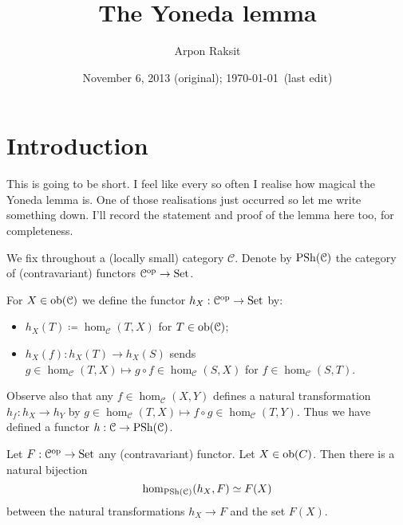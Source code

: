 


\title{The Yoneda lemma}
\author{Arpon Raksit}
\date{November 6, 2013 (original); \today\ (last edit)}


\maketitle
\thispagestyle{fancy}


\renewcommand{\C}{\mathcal{C}}

\section{Introduction}

This is going to be short. I feel like every so often I realise how
magical the Yoneda lemma is. One of those realisations just occurred
so let me write something down. I'll record the statement and proof of
the lemma here too, for completeness.

\begin{notation}
  We fix throughout a (locally small) category $\C$. Denote by
  $\PSh(\C)$ the category of (contravariant) functors $\C^\op \to
  \Set$.
\end{notation}

\begin{definition}
  For $X \in \ob(\C)$ we define the functor $h_X : \C^\op \to \Set$
  by:
  \begin{itemize}
  \item $h_X(T) \coloneqq \hom_\C(T,X)$ for $T \in \ob(\C)$;
  \item $h_X(f) : h_X(T) \to h_X(S)$ sends $g \in \hom_\C(T,X) \mapsto
    g \circ f \in \hom_\C(S,X)$ for $f \in \hom_\C(S,T)$.
  \end{itemize}
  Observe also that any $f \in \hom_\C(X,Y)$ defines a natural
  transformation $h_f : h_X \to h_Y$ by $g \in \hom_\C(T,X) \mapsto f
  \circ g \in \hom_\C(T,Y)$. Thus we have defined a functor $h : \C
  \to \PSh(\C)$.
\end{definition}

\begin{lemma}[Yoneda]
  Let $F : \C^\op \to \Set$ any (contravariant) functor. Let $X \in
  \operatorname{ob}(C)$. Then there is a natural bijection
  \[
  \hom_{\PSh(\C)}(h_X,F) \simeq F(X)
  \]
  between the natural transformations $h_X \to F$ and the set $F(X)$.
\end{lemma}

